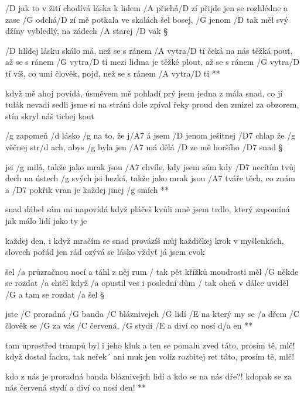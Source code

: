 
/D jak to v žití chodívá láska k lidem /A přichá/D zí
přijde jen se rozhlédne a zase /G odchá/D zí
mě potkala ve skalách šel bosej, /G jenom /D tak
měl svý džíny vybledlý, na zádech /A starej /D vak \S

\R /D hlídej lásku skálo má, než se s ránem /A vytra/D tí
   čeká na nás těžká pouť, až se s ránem /G vytra/D tí
   mezi lidma je těžké plout, až se s ránem /G vytra/D tí
   víš, co umí člověk, pojď, než se s ránem /A vytra/D tí **

když mě ahoj povídá, úsměvem mě pohladí
prý jsem jedna z mála snad, co jí tulák nevadí
sedli jsme si na stráni dole zpíval řeky proud
den zmizel za obzorem, stín skryl náš tichej kout




/g zapomeň /d lásko /g na to, že j/A7 á
jsem /D jenom ješitnej /D7 chlap
že /g věčnej str/d ach, abys /g byla jen /A7 má
dělá /D ze mě horšího /D7 snad \S

\R jsi /g milá, takže jako mrak jsou /A7 chvíle, kdy jsem sám
   kdy /D7 necítím tvůj dech na ústech /g svých
   jsi hezká, takže jako mrak jsou /A7 tváře těch, co znám
   a /D7 pokřik vran je každej jinej /g smích **

snad  ďábel sám mi napovídá
když pláčeš kvůli mně
jsem trdlo, který zapomíná
jak málo lidí jako ty je \s

každej den, i když mračím se snad
provázíš můj každičkej krok
v myšlenkách, slovech pořád jen rád
ozývá se lásko vždyť já jsem cvok




šel /a průzračnou nocí a táhl z něj rum
/ tak pět křížků moudrosti měl
/G někde se rozdat /a chtěl
když /a opustil ves i poslední dům
/ tak oheň v dálce uviděl
/G a tam se rozdat /a šel \S

\R jste /C proradná /G banda /C bláznivejch /G lidí
   /E na který my se /a dřem
   /C člověk se /G za vás /C červená, /G stydí
   /E a diví co nosí d/a en **

tam uprostřed trampů byl i jeho kluk
a ten se pomalu zved
táto, prosím tě, mlč!
když dostal facku, tak neřek´ ani muk
jen volíz rozbitej ret
táto, prosím tě, mlč! \s

\R kdo z nás je proradná banda bláznivejch lidí
   a kdo se na nás dře?!
   kdopak se za nás červená stydí
   a diví co nosí den! **


